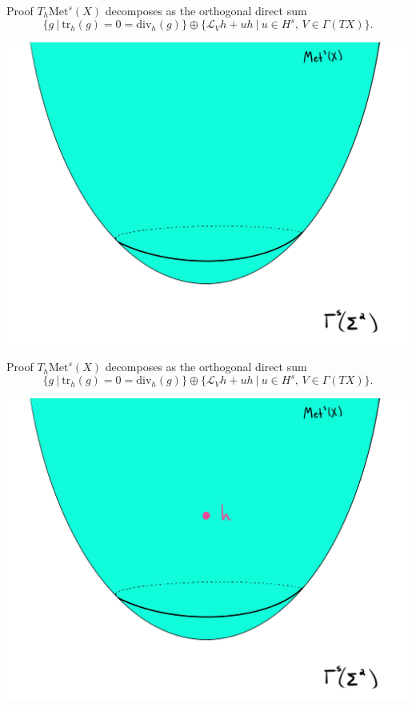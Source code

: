 \documentclass[professionalfont]{beamer}
\begin{document}
\begin{frame}{Proof}
$T_h\mathrm{Met}^s(X)$ decomposes as the orthogonal direct sum 
\[
\{ g \ | \ \mathrm{tr}_h (g) = 0 = \mathrm{div}_h(g) \} \oplus \{\mathcal{L}_V h + u h \ |\ u \in H^s \text{, } V \in \Gamma(TX) \}.
\] \pause 

\centering\includegraphics[scale=0.09]{Tangent-1.jpg}

\end{frame}





\begin{frame}{Proof}
$T_h\mathrm{Met}^s(X)$ decomposes as the orthogonal direct sum 
\[
\{ g \ | \ \mathrm{tr}_h (g) = 0 = \mathrm{div}_h(g) \} \oplus \{\mathcal{L}_V h + u h \ |\ u \in H^s \text{, } V \in \Gamma(TX) \}.
\]  

\centering\includegraphics[scale=0.09]{Tangent-2.jpg}

\end{frame}
\end{document}
